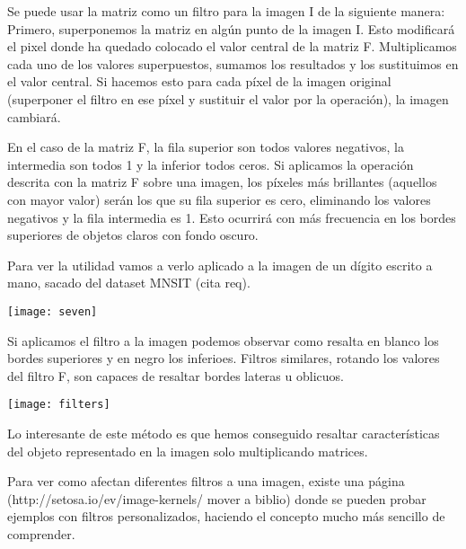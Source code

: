 Se puede usar la matriz como un filtro para la imagen I de la siguiente manera: Primero, superponemos la matriz en algún punto de la imagen I. Esto modificará el pixel donde ha quedado colocado el valor central de la matriz F.  Multiplicamos cada uno de los valores superpuestos, sumamos los resultados y los sustituimos en el valor central. Si hacemos esto para cada píxel de la imagen original (superponer el filtro en ese píxel y sustituir el valor por la operación), la imagen cambiará.

En el caso de la matriz F, la fila superior son todos valores negativos, la intermedia son todos 1 y la inferior todos ceros. Si aplicamos la operación descrita con la matriz F sobre una imagen, los píxeles más brillantes (aquellos con mayor valor) serán los que su fila superior es cero, eliminando los valores negativos y la fila intermedia es 1. Esto ocurrirá con más frecuencia en los bordes superiores de objetos claros con fondo oscuro.

Para ver la utilidad vamos a verlo aplicado a la imagen de un dígito escrito a mano, sacado del dataset MNSIT (cita req).
\begin{center}
  \texttt{[image: seven]}
\end{center}

Si aplicamos el filtro a la imagen podemos observar como resalta en blanco los bordes superiores y en negro los inferioes. Filtros similares, rotando los valores del filtro F, son capaces de resaltar bordes lateras u oblicuos.

\begin{center}
  \texttt{[image: filters]}
\end{center}

Lo interesante de este método es que hemos conseguido resaltar características del objeto representado en la imagen solo multiplicando matrices.

Para ver como afectan diferentes filtros a una imagen, existe una página (http://setosa.io/ev/image-kernels/ mover a biblio) donde se pueden probar ejemplos con filtros personalizados, haciendo el concepto mucho más sencillo de comprender.


